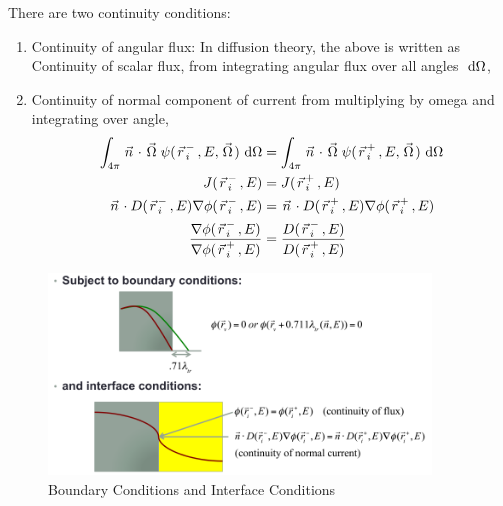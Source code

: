 \documentclass{school-22.211-notes}
\begin{document}
\clearpage
{}
There are two continuity conditions:
\begin{enumerate}
\item Continuity of angular flux: 
  In diffusion theory, the above is written as Continuity of scalar flux, from integrating angular flux over all angles $\mbox{ }\mathrm{d} \Omega$, 
\item Continuity of normal component of current from multiplying by omega and integrating over angle, 
  \begin{align}
    \int_{4\pi} \left.\vec{n}\right. \cdot \left.\vec{\Omega}\right. \psi(\left.\vec{r}\right._i^-, E, \left.\vec{\Omega}\right.) \mbox{ }\mathrm{d} \Omega &= \int_{4\pi} \left.\vec{n}\right. \cdot \left.\vec{\Omega}\right. \psi(\left.\vec{r}\right._i^+, E, \left.\vec{\Omega}\right.) \mbox{ }\mathrm{d} \Omega \\
    J(\left.\vec{r}\right._i^-, E) &= J(\left.\vec{r}\right._i^+, E) \\
    \left.\vec{n}\right. \cdot D(\left.\vec{r}\right._i^-, E) \nabla \phi(\left.\vec{r}\right._i^-, E) &= \left.\vec{n}\right. \cdot D(\left.\vec{r}\right._i^+, E) \nabla \phi(\left.\vec{r}\right._i^+, E) \\
    \frac{\nabla \phi(\left.\vec{r}\right._i^-, E)}{\nabla \phi(\left.\vec{r}\right._i^+, E)} &= \frac{D(\left.\vec{r}\right._i^-, E)}{D(\left.\vec{r}\right._i^+, E)} 
  \end{align}
\end{enumerate}
\begin{figure}
  \centering
  \includegraphics[width=4in]{images/dfs/boundary-interface.png}
  \caption{Boundary Conditions and Interface Conditions} \label{boundary-interface}
\end{figure}
\end{document}
